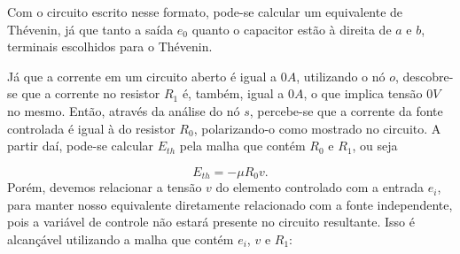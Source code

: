 \documentclass{article}
\numberwithin{equation}{section}
\begin{document}
\begin{center}
\end{center}

\noindent Com o circuito escrito nesse formato, pode-se calcular um equivalente de Thévenin, já que tanto a saída $e_0$ quanto o capacitor estão à direita de $a$ e $b$, terminais escolhidos para o Thévenin.

\begin{center}
\end{center}

\noindent Já que a corrente em um circuito aberto é igual a $0A$, utilizando o nó $o$, descobre-se que a corrente no resistor $R_1$ é, também, igual a $0A$, o que implica tensão $0V$ no mesmo. Então, através da análise do nó $s$, percebe-se que a corrente da fonte controlada é igual à do resistor $R_0$, polarizando-o como mostrado no circuito.
A partir daí, pode-se calcular $E_{th}$ pela malha que contém $R_0$ e $R_1$, ou seja

$$E_{th}=-\mu R_0v.$$
Porém, devemos relacionar a tensão $v$ do elemento controlado com a entrada $e_i$, para manter nosso equivalente diretamente relacionado com a fonte independente, pois a variável de controle não estará presente no circuito resultante. Isso é alcançável utilizando a malha que contém $e_i$, $v$ e $R_1$:
\end{document}
